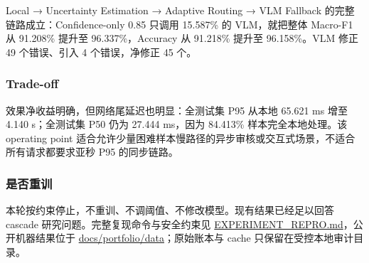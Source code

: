 \documentclass[
  a4paper,
]{article}
\begin{document}
Local → Uncertainty Estimation → Adaptive Routing → VLM Fallback
的完整链路成立：Confidence-only 0.85 只调用 15.587\% 的 VLM，就把整体
Macro-F1 从 91.208\% 提升至 96.337\%，Accuracy 从 91.218\% 提升至
96.158\%。VLM 修正 49 个错误、引入 4 个错误，净修正 45 个。

\hypertarget{trade-off}{%
\subsubsection{Trade-off}\label{trade-off}}

效果净收益明确，但网络尾延迟也明显：全测试集 P95 从本地 65.621 ms 增至
4.140 s；全测试集 P50 仍为 27.444 ms，因为 84.413\% 样本完全本地处理。该
operating point
适合允许少量困难样本慢路径的异步审核或交互式场景，不适合所有请求都要求亚秒
P95 的同步链路。

\hypertarget{ux662fux5426ux91cdux8bad}{%
\subsubsection{是否重训}\label{ux662fux5426ux91cdux8bad}}

本轮按约束停止，不重训、不调阈值、不修改模型。现有结果已经足以回答
cascade 研究问题。完整复现命令与安全约束见
\url{EXPERIMENT_REPRO.md}，公开机器结果位于
\href{../docs/portfolio/data/}{docs/portfolio/data}；原始账本与 cache
只保留在受控本地审计目录。
\end{document}
